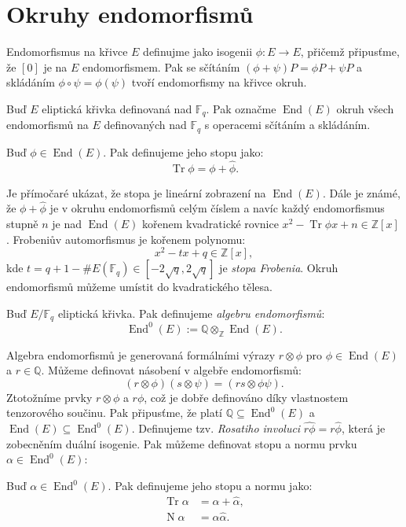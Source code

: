 \documentclass[12pt]{report}
\DeclareMathOperator{\Tr}{Tr}
\DeclareMathOperator{\N}{N}
\DeclareMathOperator{\End}{End}
\begin{document}
\section{Okruhy endomorfismů}
Endomorfismus na křivce $E$ definujme jako isogenii $\phi : E \longrightarrow E$, přičemž připusťme, že $[0]$ je na $E$ endomorfismem. Pak se sčítáním $(\phi+\psi) P = \phi P + \psi P$ a skládáním $\phi \circ \psi = \phi(\psi)$ tvoří endomorfismy na křivce okruh.
\begin{definice}
Buď $E$ eliptická křivka definovaná nad $\mathbb{F}_q$. Pak označme $\End(E)$ okruh všech endomorfismů na $E$ definovaných nad $\mathbb{F}_q$ s operacemi sčítáním a skládáním.
\end{definice}
\begin{definice}
Buď $\phi \in \End(E)$. Pak definujeme jeho stopu jako:
$$\Tr \phi = \phi + \widehat{\phi}.$$
\end{definice}
Je přímočaré ukázat, že stopa je lineární zobrazení na $\End(E)$. Dále je známé, že $\phi+\widehat{\phi}$ je v okruhu endomorfismů celým číslem a navíc každý endomorfismus stupně $n$ je nad $\End(E)$ kořenem kvadratické rovnice $x^2 - \Tr \phi x + n \in \mathbb{Z}[x]$. Frobeniův automorfismus je kořenem polynomu:
$$x^2 - tx + q \in \mathbb{Z}[x],$$
kde $t = q+1-\#E(\mathbb{F}_q) \in [-2\sqrt{q},2\sqrt{q}]$ je \textit{stopa Frobenia}.
Okruh endomorfismů můžeme umístit do kvadratického tělesa. 
\begin{definice}
Buď $E/\mathbb{F}_q$ eliptická křivka. Pak definujeme \textit{algebru endomorfismů}: $$\End^0 (E) := \mathbb{Q} \otimes_{\mathbb{Z}} \End(E).$$
\end{definice}
Algebra endomorfismů je generovaná formálními výrazy $r \otimes \phi$ pro $\phi \in \End(E)$ a $r \in \mathbb{Q}$. Můžeme definovat násobení v algebře endomorfismů:
$$(r \otimes \phi)(s \otimes \psi) = (rs \otimes \phi \psi).$$
Ztotožníme prvky $r \otimes \phi$ a $r \phi$, což je dobře definováno díky vlastnostem tenzorového součinu. Pak připusťme, že platí $\mathbb{Q} \subseteq \End^0 (E)$ a $\End(E) \subseteq \End^0 (E)$. Definujeme tzv. \textit{Rosatiho involuci} $\widehat{r \phi} = r \widehat{\phi}$, která je zobecněním duální isogenie. Pak můžeme definovat stopu a normu prvku $\alpha \in \End^0 (E)$:
\begin{definice}
Buď $\alpha \in \End^0(E)$. Pak definujeme jeho stopu a normu jako:
\begin{align*}
\Tr \alpha &= \alpha + \widehat{\alpha},\\
\N \alpha &= \alpha \widehat{\alpha}.
\end{align*}
\end{definice}
\end{document}
